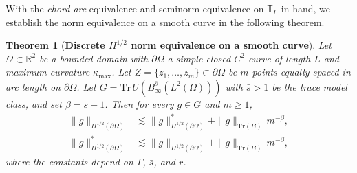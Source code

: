 \documentclass[11pt]{article}
\newtheorem{theorem}{Theorem}
\begin{document}
With the \textit{chord-arc} equivalence and seminorm equivalence on $\mathbb{T}_L$ in hand, we establish the norm equivalence on a smooth curve in the following theorem.


\begin{theorem}[\textbf{Discrete $H^{1/2}$ norm equivalence on a smooth curve}]
\label{thm:h12_curve}
Let $\Omega \subset \mathbb{R}^2$ be a bounded domain with
$\partial\Omega$ a simple closed $C^2$ curve of length $L$ and
maximum curvature $\kappa_{\max}$. Let
$Z = \{z_1, \ldots, z_m\} \subset \partial\Omega$ be $m$ points
equally spaced in arc length on $\partial\Omega$. Let
$G = \mathrm{Tr}\, U(B^{\bar{s}}_\infty(L^2(\Omega)))$ with
$\bar{s} > 1$ be the trace model class, and set $\beta = \bar{s}-1$.
Then for every $g \in G$ and $m \ge 1$,
\begin{align}
  \|g\|_{H^{1/2}(\partial\Omega)}
  &\lesssim \|g\|^*_{H^{1/2}(\partial\Omega)}
   + \|g\|_{\mathrm{Tr}(B)}\, m^{-\beta},
  \label{eq:thm2-upper} \\
  \|g\|^*_{H^{1/2}(\partial\Omega)}
  &\lesssim \|g\|_{H^{1/2}(\partial\Omega)}
   + \|g\|_{\mathrm{Tr}(B)}\, m^{-\beta},
  \label{eq:thm2-lower}
\end{align}
where the constants depend on $\Gamma$, $\bar{s}$, and $r$.
\end{theorem}
\end{document}
